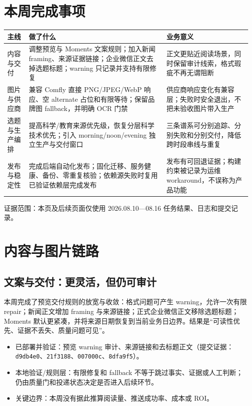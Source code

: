 \documentclass[UTF8,11pt,a4paper,fontset=none]{ctexart}
\begin{document}
\section{本周完成事项}
\noindent\begin{tabularx}{\textwidth}{L{2.8cm}L{6.1cm}Y}\toprule
{}\color{white}\bfseries\sffamily 主线&\color{white}\bfseries\sffamily 做了什么&\color{white}\bfseries\sffamily 业务意义\\\midrule
内容与交付&调整预览与 Moments 文案规则；加入新闻 framing、来源证据链接；企业微信正文去掉选题标题；warning 只记录并支持有限修复&正文更贴近阅读场景，同时保留审计线索，格式瑕疵不再无谓阻断\\
图片与供应商&兼容 Comfly 直接 PNG/JPEG/WebP 响应、空 alternate 占位和有限等待；保留品牌图 fallback，并明确 OCR 门禁&供应商响应变化有兼容层；失败时安全退出，不把未验收图片带入生产\\
选题与生产编排&提高科学/教育来源优先级，恢复分层科学技术优先；引入 morning/noon/evening 独立生产与交付窗口&三条谱系可分别追踪、分别失败和分别交付，降低跨时段串线与重复\\
发布与稳定性&完成后端自动化发布；固化迁移、服务健康、备份、零重复核验；依赖源失败时复用已验证依赖层完成发布&发布有可回退证据；构建约束被记录为运维 workaround，不误称为产品功能\\\bottomrule\end{tabularx}
\vfill\begin{center}\small\sffamily\color{muted}证据范围：本页及后续页面仅使用 2026.08.10—08.16 任务结果、日志和提交记录。\end{center}
\newpage
\section{内容与图片链路}
\subsection{文案与交付：更灵活，但仍可审计}
\begin{infobox}
本周完成了预览交付规则的放宽与收敛：格式问题可产生 warning，允许一次有限 repair；新闻正文增加 framing 与来源链接；正式企业微信正文移除选题标题；Moments 默认更紧凑，并将来源日期恢复到当前业务日边界。结果是“可读性优先、证据不丢失、质量问题可见”。\end{infobox}
\begin{itemize}[leftmargin=2em,itemsep=0.25em]
\item 已部署并验证：预览 warning 审计、来源链接和去标题正文（提交证据：\texttt{d9db4e0}、\texttt{21f3188}、\texttt{007000c}、\texttt{8dfa9f5}）。
\item 本地验证/规则层：有限修复和 fallback 不等于跳过事实、证据或人工判断；仍由质量门和投递状态决定是否进入后续环节。
\item 关键边界：本周没有据此推算阅读量、推送成功率、成本或 ROI。
\end{itemize}
\end{document}
